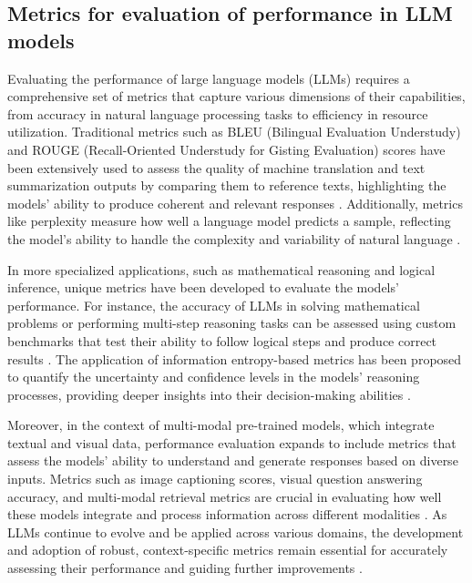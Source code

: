 \subsection*{Metrics for evaluation of performance in LLM models}
Evaluating the performance of large language models (LLMs) requires a comprehensive set of metrics that capture various dimensions of their capabilities, from accuracy in natural language processing tasks to efficiency in resource utilization. Traditional metrics such as BLEU (Bilingual Evaluation Understudy) and ROUGE (Recall-Oriented Understudy for Gisting Evaluation) scores have been extensively used to assess the quality of machine translation and text summarization outputs by comparing them to reference texts, highlighting the models' ability to produce coherent and relevant responses \cite{zhang2022opt}. Additionally, metrics like perplexity measure how well a language model predicts a sample, reflecting the model's ability to handle the complexity and variability of natural language \cite{zhang2022opt}.

In more specialized applications, such as mathematical reasoning and logical inference, unique metrics have been developed to evaluate the models' performance. For instance, the accuracy of LLMs in solving mathematical problems or performing multi-step reasoning tasks can be assessed using custom benchmarks that test their ability to follow logical steps and produce correct results \cite{yuan2023scaling} \cite{creswell2022selectioninference}. The application of information entropy-based metrics has been proposed to quantify the uncertainty and confidence levels in the models' reasoning processes, providing deeper insights into their decision-making abilities \cite{zhou-etal-2023-inform}.

Moreover, in the context of multi-modal pre-trained models, which integrate textual and visual data, performance evaluation expands to include metrics that assess the models' ability to understand and generate responses based on diverse inputs. Metrics such as image captioning scores, visual question answering accuracy, and multi-modal retrieval metrics are crucial in evaluating how well these models integrate and process information across different modalities \cite{wang2024largescale}. As LLMs continue to evolve and be applied across various domains, the development and adoption of robust, context-specific metrics remain essential for accurately assessing their performance and guiding further improvements \cite{minaee2024large}.